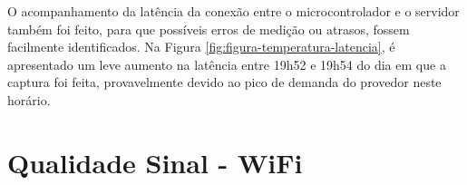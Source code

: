        \begin{figure}[!h]
    	\end{figure}
\newpage

O acompanhamento da latência da conexão entre o microcontrolador e o servidor também foi feito, para que possíveis erros de medição ou atrasos, fossem facilmente identificados. Na Figura \ref{fig:figura-temperatura-latencia}, é apresentado um leve aumento na latência entre 19h52 e 19h54 do dia em que a captura foi feita, provavelmente devido ao pico de demanda do provedor neste horário.
    	
        \begin{figure}[!h]
    	\end{figure}
\section{Qualidade Sinal - WiFi}
\label{sec:qualidade-sinal}

